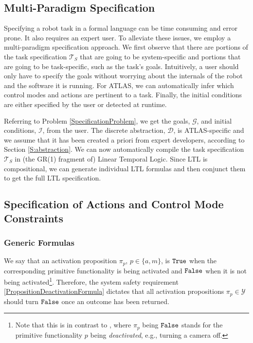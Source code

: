 
\subsection{Multi-Paradigm Specification}

Specifying a robot task in a formal language can be time consuming and error prone. It also requires an expert user.
To alleviate these issues, we employ a multi-paradigm specification approach. 
We first observe that there are portions of the task specification $\mathcal{T}_S$ that are going to be system-specific and portions that are going to be task-specific, such as the task's goals.
Intuitively, a user should only have to specify the goals without worrying about the internals of the robot and the software it is running.
For ATLAS, we can automatically infer which control modes and actions are pertinent to a task.
Finally, the initial conditions are either specified by the user or detected at runtime.

Referring to Problem \ref{SpecificationProblem}, we get the goals, $\mathcal{G}$, and initial conditions, $\mathcal{I}$, from the user.
The discrete abstraction, $\mathcal{D}$, is ATLAS-specific and we assume that it has been created a priori from expert developers, according to Section \ref{S:abstraction}.
We can now automatically compile the task specification $\mathcal{T}_S$ in (the GR(1) fragment \cite{piterman_06} of) Linear Temporal Logic.
Since LTL is compositional, we can generate individual LTL formulas and then conjunct them to get the full LTL specification.

\subsection{Specification of Actions and Control Mode Constraints}

\subsubsection{Generic Formulas}

We say that an activation proposition $\pi_p$, $p \in \{a, m\}$, is $\mathtt{True}$ when the corresponding primitive functionality is being activated and $\mathtt{False}$ when it is not being activated\footnote{Note that this is in contrast to \cite{Vasu2013ICRA}, where $\pi_p$ being $\mathtt{False}$ stands for the primitive functionality $p$ being \emph{deactivated}, e.g., turning a camera off.}.
Therefore, the system safety requirement \eqref{PropositionDeactivationFormula} dictates that all activation propositions $\pi_p \in \mathcal{Y}$ should turn $\mathtt{False}$ once an outcome has been returned.

